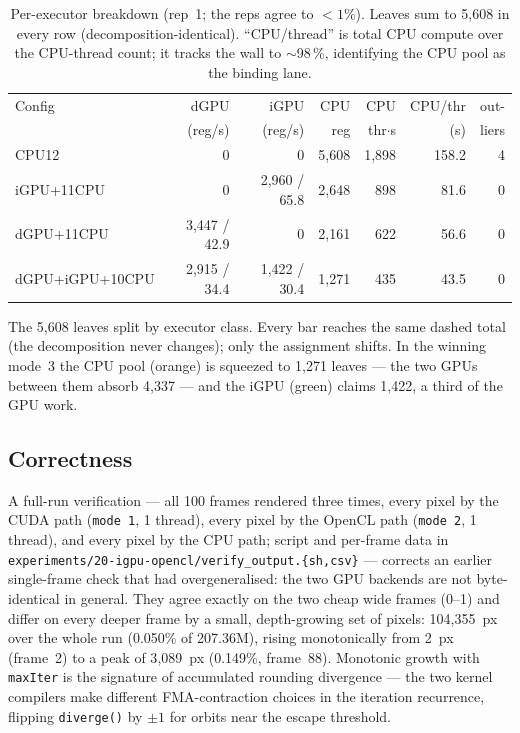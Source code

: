 \documentclass[
	english,
	letterpaper, oneside
]{article}
\begin{document}
\begin{table}[H]
    \centering
    \caption{Per-executor breakdown (rep~1; the reps agree to $<1\%$). Leaves sum
             to 5{,}608 in every row (decomposition-identical). ``CPU/thread'' is
             total CPU compute over the CPU-thread count; it tracks the wall to
             $\sim$98\,\%, identifying the CPU pool as the binding lane.}
    \label{tab:breakdown}
    \begin{tabular}{lrrrrrr}
        \hline
        Config & dGPU & iGPU & CPU & CPU & CPU/thr & out- \\
                        & (reg/s) & (reg/s) & reg & thr$\cdot$s & (s) & liers \\
        \hline
        CPU12           & 0      & 0      & 5{,}608 & 1{,}898 & 158.2 & 4 \\
        iGPU+11CPU      & 0      & 2{,}960 / 65.8 & 2{,}648 & 898 & 81.6 & 0 \\
        dGPU+11CPU      & 3{,}447 / 42.9 & 0 & 2{,}161 & 622 & 56.6 & 0 \\
        dGPU+iGPU+10CPU & 2{,}915 / 34.4 & 1{,}422 / 30.4 & 1{,}271 & 435 & 43.5 & 0 \\
        \hline
    \end{tabular}
\end{table}

            {The 5{,}608 leaves split by executor class. Every bar reaches the same
             dashed total (the decomposition never changes); only the assignment
             shifts. In the winning mode~3 the CPU pool (orange) is squeezed to
             1{,}271 leaves --- the two GPUs between them absorb 4{,}337 --- and the
             iGPU (green) claims 1{,}422, a third of the GPU work.
             \label{fig:work}}

\subsection{Correctness}

A full-run verification --- all 100 frames rendered three times, every pixel by
the CUDA path (\texttt{mode 1}, 1 thread), every pixel by the OpenCL path
(\texttt{mode 2}, 1 thread), and every pixel by the CPU path; script and per-frame
data in \texttt{experiments/20-igpu-opencl/verify\_output.\{sh,csv\}} ---
corrects an earlier single-frame check that had overgeneralised: the two GPU
backends are not byte-identical in general. They agree exactly on the two
cheap wide frames (0--1) and differ on every deeper frame by a small,
depth-growing set of pixels: 104{,}355~px over the whole run (0.050\% of
207.36M), rising monotonically from 2~px (frame~2) to a peak of 3{,}089~px
(0.149\%, frame~88). Monotonic growth with \texttt{maxIter} is the
signature of accumulated rounding divergence --- the two kernel compilers make
different FMA-contraction choices in the iteration recurrence, flipping
\texttt{diverge()} by $\pm1$ for orbits near the escape threshold.
\end{document}
